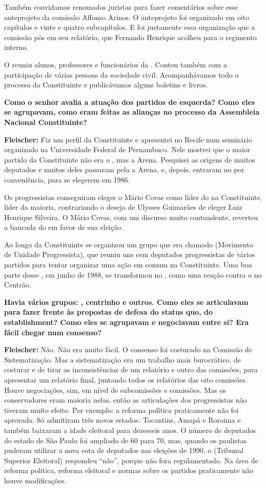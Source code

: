 Também convidamos renomados juristas para fazer comentários sobre esse
anteprojeto da comissão Affonso Arinos. O anteprojeto foi organizado em
oito capítulos e vinte e quatro subcapítulos. E foi justamente essa
organização que a comissão pôs em seu relatório, que Fernando Henrique
acolheu para o regimento interno.

O  reuniu alunos, professores e funcionários da . Contou também
com a participação de várias pessoas da sociedade civil. Acompanhávamos
todo o processo da Constituinte e publicávamos alguns boletins e livros.

\textbf{Como o senhor avalia a atuação dos partidos de esquerda? Como
eles se agrupavam, como eram feitas as alianças no processo da
Assembleia Nacional Constituinte?}

\textbf{Fleischer:} Fiz um perfil da Constituinte e apresentei no Recife
num seminário organizado na Universidade Federal de Pernambuco. Nele
mostrei que o maior partido da Constituinte não era o , mas a Arena.
Pesquisei as origens de muitos deputados e muitos deles passaram pela a
Arena,  e, depois, entraram no  por conveniência, para se
elegerem em 1986.

Os progressistas conseguiram eleger o Mário Covas como líder do  na
Constituinte, líder da maioria, contrariando o desejo de Ulysses
Guimarães de eleger Luiz Henrique Silveira. O Mário Covas, com um
discurso muito contundente, reverteu a bancada do  em favor de sua
eleição.

Ao longo da Constituinte se organizou um grupo que era chamado 
(Movimento de Unidade Progressista), que reuniu uns cem deputados
progressistas de vários partidos para tentar organizar uma ação em comum
na Constituinte. Uma boa parte desse , em junho de 1988, se
transformou no , como uma reação contra o  no Centrão.

\textbf{Havia vários grupos: , centrinho e outros. Como eles se
articulavam para fazer frente às propostas de defesa do status quo, do
establishment? Como eles se agrupavam e negociavam entre si? Era fácil
chegar num consenso?}

\textbf{Fleischer:} Não. Não era muito fácil. O consenso foi costurado
na Comissão de Sistematização. Mas a sistematização era um trabalho mais
burocrático, de costurar e de tirar as inconsistências de um relatório e
outro das comissões, para apresentar um relatório final, juntando todos
os relatórios das oito comissões. Houve negociações, sim, em nível de
subcomissões e comissões. Mas os conservadores eram maioria nelas, então
as articulações dos progressistas não tiveram muito efeito. Por exemplo:
a reforma política praticamente não foi aprovada. Só admitiram três
novos estados: Tocantins, Amapá e Roraima e também baixaram a idade
eleitoral para dezesseis anos. O número de deputados do estado de São
Paulo foi ampliado de 60 para 70, mas, quando os paulistas puderam
utilizar a nova cota de deputados nas eleições de 1990, o  (Tribunal
Superior Eleitoral) respondeu ``não'', porque não fora regulamentado. Na
área de reforma politica, reforma eleitoral e normas sobre os partidos
praticamente não houve modificações.

